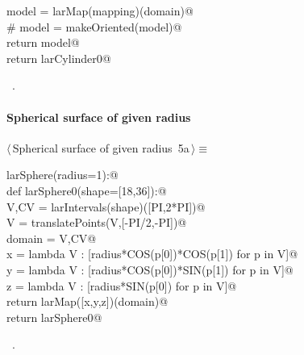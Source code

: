 \documentclass[11pt,oneside]{article}	%
\begin{document}
\begin{flushleft}
\begin{list}{}{}
\mbox{}\verb@      model = larMap(mapping)(domain)@\\
\mbox{}\verb@      # model = makeOriented(model)@\\
\mbox{}\verb@      return model@\\
\mbox{}\verb@   return larCylinder0@\\
\mbox{}\verb@@{\NWsep}
\end{list}
\vspace{-1ex}
\footnotesize\addtolength{\baselineskip}{-1ex}
\begin{list}{}{\setlength{\itemsep}{-\parsep}\setlength{\itemindent}{-\leftmargin}}
\item \NWtxtMacroRefIn\ .
\end{list}
\end{flushleft}
\paragraph{Spherical surface of given radius}
\begin{flushleft} \small \label{scrap10}
\protect{}$\langle\,$Spherical surface of given radius\nobreak\ {\footnotesize 5a}$\,\rangle\equiv$
\vspace{-1ex}
\begin{list}{}{} \item
\mbox{}\verb@def larSphere(radius=1):@\\
\mbox{}\verb@   def larSphere0(shape=[18,36]):@\\
\mbox{}\verb@      V,CV = larIntervals(shape)([PI,2*PI])@\\
\mbox{}\verb@      V = translatePoints(V,[-PI/2,-PI])@\\
\mbox{}\verb@      domain = V,CV@\\
\mbox{}\verb@      x = lambda V : [radius*COS(p[0])*COS(p[1]) for p in V]@\\
\mbox{}\verb@      y = lambda V : [radius*COS(p[0])*SIN(p[1]) for p in V]@\\
\mbox{}\verb@      z = lambda V : [radius*SIN(p[0]) for p in V]@\\
\mbox{}\verb@      return larMap([x,y,z])(domain)@\\
\mbox{}\verb@   return larSphere0@\\
\mbox{}\verb@@{\NWsep}
\end{list}
\vspace{-1ex}
\footnotesize\addtolength{\baselineskip}{-1ex}
\begin{list}{}{\setlength{\itemsep}{-\parsep}\setlength{\itemindent}{-\leftmargin}}
\item \NWtxtMacroRefIn\ .
\end{list}
\end{flushleft}
\end{document}
